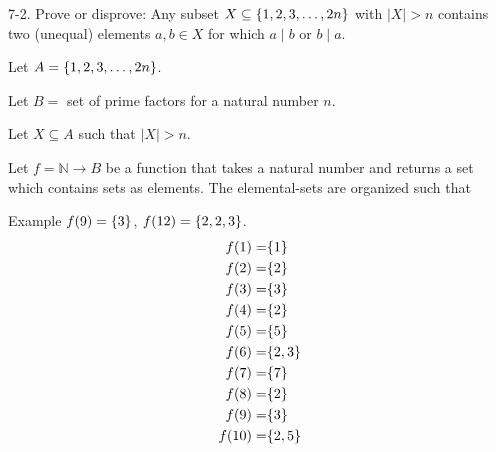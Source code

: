\documentclass{article}
\begin{document}
\begin{exercise}{}{}
	{7-2. Prove or disprove: Any subset $X \subseteq\{1,2,3, \ldots,
				2 n\}$ with $|X|>n$ contains two (unequal) elements $a, b \in X$ for which
		$a \mid b$ or $b \mid a$.}
	\begin{alist}
		\item Let $A=\{1,2,3, \ldots, 2 n\}$.
		\item Let $B=$ set of prime factors for a natural number $n$.
		\item Let $X\subseteq A$ such that $|X|>n$.
		\item Let $f=\mathbb{N} \rightarrow B $ be a function that takes a natural
		number and returns a set which contains sets as elements. The elemental-sets
		are organized such that
		\item Example $f(9) = \{3\}$, $f(12) = \{2, 2, 3\}$.
		\begin{align*}
			f(1) =  & \{1\}    \\
			f(2) =  & \{2\}    \\
			f(3) =  & \{3\}    \\
			f(4) =  & \{2\}    \\
			f(5) =  & \{5\}    \\
			f(6) =  & \{2, 3\} \\
			f(7) =  & \{7\}    \\
			f(8) =  & \{2\}    \\
			f(9) =  & \{3\}    \\
			f(10) = & \{2, 5\}
		\end{align*}
	\end{alist}
\end{exercise}{}{}
\end{document}
